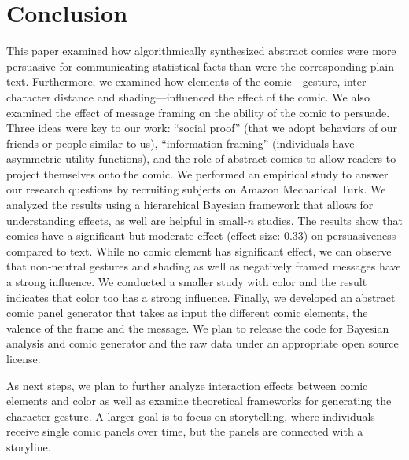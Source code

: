\section{Conclusion}
\label{sec:Conclusion}

This paper examined how algorithmically synthesized abstract comics were more persuasive for communicating statistical facts than were the corresponding plain text. Furthermore, we examined how elements of the comic---gesture, inter-character distance and shading---influenced the effect of the comic. We also examined the effect of message framing on the ability of the comic to persuade. Three ideas were key to our work: ``social proof'' (that we adopt behaviors of our friends or people similar to us), ``information framing'' (individuals have asymmetric utility functions), and the role of abstract comics to allow readers to project themselves onto the comic. We performed an empirical study to answer our research questions by recruiting subjects on Amazon Mechanical Turk. We analyzed the results using a hierarchical Bayesian framework that allows for understanding effects, as well are helpful in small-$n$ studies. The results show that comics have a significant but moderate effect (effect size: 0.33) on persuasiveness compared to text. While no comic element has significant effect, we can observe that non-neutral gestures and shading as well as negatively framed messages have a strong influence. We conducted a smaller study with color and the result indicates that color too has a strong influence. Finally, we developed an abstract comic panel generator that takes as input the different comic elements, the valence of the frame and the message. We plan to release the code for Bayesian analysis and comic generator and the raw data under an appropriate open source license.

As next steps, we plan to further analyze interaction effects between comic elements and color as well as examine theoretical frameworks for generating the character gesture. A larger goal is to focus on storytelling, where individuals receive single comic panels over time, but the panels are connected with a storyline.
